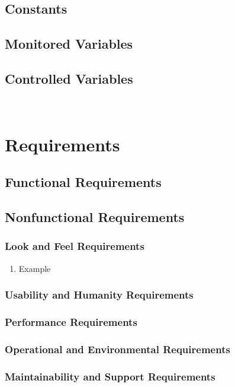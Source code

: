 \documentclass[12pt]{article}
\begin{document}
\subsection{Constants}
\subsection{Monitored Variables}
\subsection{Controlled Variables}

~\newpage

\section{Requirements}
\subsection{Functional Requirements}
\subsection{Nonfunctional Requirements}

\setcounter{vnvSectionNfr}{1}

\setcounter{nfrNum}{1}

\subsubsection{Look and Feel Requirements}
\noindent \begin{enumerate}
    \item Example
\end{enumerate}
\subsubsection{Usability and Humanity Requirements}
\subsubsection{Performance Requirements}
\subsubsection{Operational and Environmental Requirements}
\subsubsection{Maintainability and Support Requirements}
\end{document}
